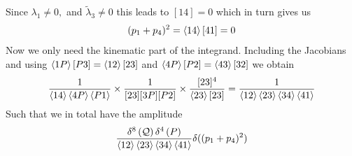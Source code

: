 \documentclass[letter,11pt]{article}
\begin{document}
Since $\lambda_1\neq0,$ and $\tilde\lambda_3\neq0$ this leads to $[14]=0$ which in turn gives us
\begin{equation}
	\begin{aligned}
		(p_1+p_4)^2=\expval{14}[41]=0
	\end{aligned}
\end{equation}
Now we only need the kinematic part of the integrand. Including the Jacobians and using $\expval{1P}[P3]=\expval{12}[23]$ and $\expval{4P}[P2]=\expval{43}[32]$ we obtain
\begin{equation}
	\begin{aligned}
		\frac{1}{\expval{14}\expval{4P}\expval{P1}}\times\frac{1}{[23][3P][P2]}\times \frac{[23]^4}{\expval{23}[23]}&=\frac{1}{\expval{12}\expval{23}\expval{34}\expval{41}}\\
	\end{aligned}
\end{equation}
Such that we in total have the amplitude
\begin{equation}
	\begin{aligned}
		\frac{\delta^{8}\left(\mathcal{Q}\right)\delta^{4}\left(P\right)}{\expval{12}\expval{23}\expval{34}\expval{41}}\delta((p_1+p_4)^2)
	\end{aligned}
\end{equation}
\end{document}
